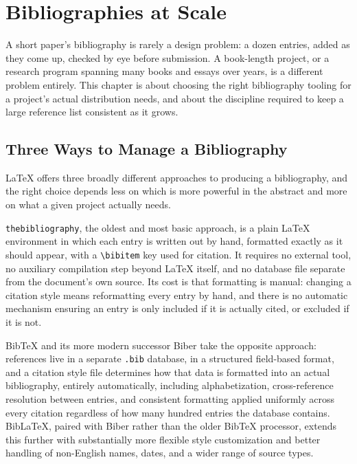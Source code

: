 \hypertarget{chapter-12-bibliographies-at-scale}{%
\chapter{Bibliographies at Scale}\label{chapter-12-bibliographies-at-scale}}

A short paper's bibliography is rarely a design problem: a dozen entries, added as they come up, checked by eye before submission. A book-length project, or a research program spanning many books and essays over years, is a different problem entirely. This chapter is about choosing the right bibliography tooling for a project's actual distribution needs, and about the discipline required to keep a large reference list consistent as it grows.

\hypertarget{three-ways-to-manage-a-bibliography}{%
\section{Three Ways to Manage a Bibliography}\label{three-ways-to-manage-a-bibliography}}

LaTeX offers three broadly different approaches to producing a bibliography, and the right choice depends less on which is more powerful in the abstract and more on what a given project actually needs.

\texttt{thebibliography}, the oldest and most basic approach, is a plain LaTeX environment in which each entry is written out by hand, formatted exactly as it should appear, with a \texttt{\textbackslash{}bibitem} key used for citation. It requires no external tool, no auxiliary compilation step beyond LaTeX itself, and no database file separate from the document's own source. Its cost is that formatting is manual: changing a citation style means reformatting every entry by hand, and there is no automatic mechanism ensuring an entry is only included if it is actually cited, or excluded if it is not.

BibTeX and its more modern successor Biber take the opposite approach: references live in a separate \texttt{.bib} database, in a structured field-based format, and a citation style file determines how that data is formatted into an actual bibliography, entirely automatically, including alphabetization, cross-reference resolution between entries, and consistent formatting applied uniformly across every citation regardless of how many hundred entries the database contains. BibLaTeX, paired with Biber rather than the older BibTeX processor, extends this further with substantially more flexible style customization and better handling of non-English names, dates, and a wider range of source types.

